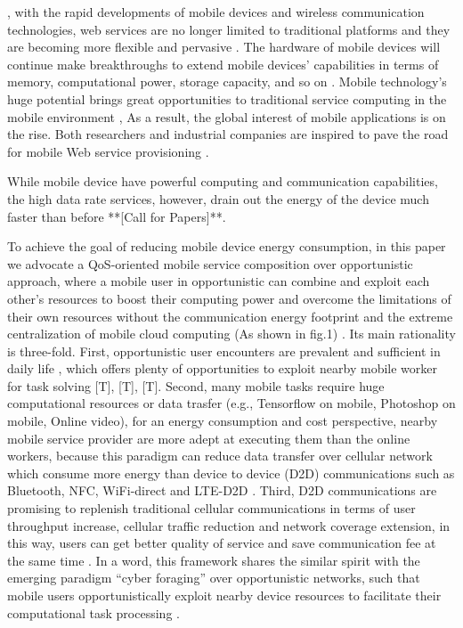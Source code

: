 \documentclass[10pt,journal,compsoc]{IEEEtran}
\begin{document}
, with the rapid developments of mobile devices and wireless communication technologies, web services are no longer limited to traditional platforms and they are becoming more flexible and pervasive \cite{Deng2017}. The hardware of mobile devices will continue make breakthroughs to extend mobile devices’ capabilities in terms of memory, computational power, storage capacity, and so on \cite{Deng2017}. Mobile technology’s huge potential brings great opportunities to traditional service computing in the mobile environment \cite{Deng2016}, As a result, the global interest of mobile applications is on the rise. Both researchers and industrial companies are inspired to pave the road for mobile Web service provisioning \cite{dinh2013survey,hu2014multidimensional}\cite{Deng2017}.

While mobile device have powerful computing and communication capabilities, the high data rate services, however, drain out the energy of the device much faster than before **[Call for Papers]**. 

To achieve the goal of reducing mobile device energy consumption, in this paper we advocate a QoS-oriented mobile service composition over opportunistic approach, where a mobile user in opportunistic can combine and exploit each other’s resources to boost their computing power and overcome the limitations of their own resources without the communication energy footprint and the extreme centralization of mobile cloud computing (As shown in fig.1) \cite{Giordano2011}. Its main rationality is three-fold. First, opportunistic user encounters are prevalent and sufficient in daily life \cite{liu2013exploring}, which offers plenty of opportunities to exploit nearby mobile worker for task solving [T], [T], [T]. Second, many mobile tasks require huge computational resources or data trasfer  (e.g., Tensorflow on mobile, Photoshop on mobile, Online video), for an energy consumption and cost perspective, nearby mobile service provider are more adept at executing them than the online workers, because this paradigm can reduce data transfer over cellular network which consume more energy than device to device (D2D) communications such as Bluetooth, NFC, WiFi-direct and LTE-D2D \cite{}\cite{}. Third, D2D communications are promising to replenish traditional cellular communications in terms of user throughput increase, cellular traffic reduction and network coverage extension,  in this way, users can get better quality of service and save communication fee at the same time \cite{asadi2014survey}. In a word, this framework shares the similar spirit with the emerging paradigm “cyber foraging” over opportunistic networks, such that mobile users opportunistically exploit nearby device resources to facilitate their computational task processing \cite{shi2012serendipity,li2014can,zhang2015offloading}\cite{Pu2017}.
\end{document}
